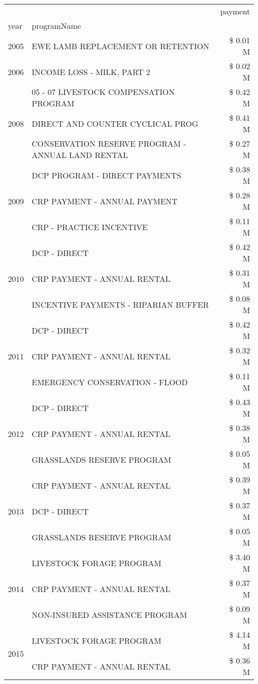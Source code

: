 \begin{tabular}{llr}
\toprule
 &  & payment \\
year & programName &  \\
\midrule
2005 & EWE LAMB REPLACEMENT OR RETENTION & \$ 0.01 M \\
\cline{1-3}
2006 & INCOME LOSS - MILK, PART 2 & \$ 0.02 M \\
\cline{1-3}
\multirow[t]{3}{*}{2008} & 05 - 07 LIVESTOCK COMPENSATION PROGRAM & \$ 0.42 M \\
 & DIRECT AND COUNTER CYCLICAL PROG & \$ 0.41 M \\
 & CONSERVATION RESERVE PROGRAM - ANNUAL LAND RENTAL & \$ 0.27 M \\
\cline{1-3}
\multirow[t]{3}{*}{2009} & DCP PROGRAM - DIRECT PAYMENTS & \$ 0.38 M \\
 & CRP PAYMENT - ANNUAL PAYMENT & \$ 0.28 M \\
 & CRP - PRACTICE INCENTIVE & \$ 0.11 M \\
\cline{1-3}
\multirow[t]{3}{*}{2010} & DCP - DIRECT & \$ 0.42 M \\
 & CRP PAYMENT - ANNUAL RENTAL & \$ 0.31 M \\
 & INCENTIVE PAYMENTS - RIPARIAN BUFFER & \$ 0.08 M \\
\cline{1-3}
\multirow[t]{3}{*}{2011} & DCP - DIRECT & \$ 0.42 M \\
 & CRP PAYMENT - ANNUAL RENTAL & \$ 0.32 M \\
 & EMERGENCY CONSERVATION - FLOOD & \$ 0.11 M \\
\cline{1-3}
\multirow[t]{3}{*}{2012} & DCP - DIRECT & \$ 0.43 M \\
 & CRP PAYMENT - ANNUAL RENTAL & \$ 0.38 M \\
 & GRASSLANDS RESERVE PROGRAM & \$ 0.05 M \\
\cline{1-3}
\multirow[t]{3}{*}{2013} & CRP PAYMENT - ANNUAL RENTAL & \$ 0.39 M \\
 & DCP - DIRECT & \$ 0.37 M \\
 & GRASSLANDS RESERVE PROGRAM & \$ 0.05 M \\
\cline{1-3}
\multirow[t]{3}{*}{2014} & LIVESTOCK FORAGE PROGRAM & \$ 3.40 M \\
 & CRP PAYMENT - ANNUAL RENTAL & \$ 0.37 M \\
 & NON-INSURED ASSISTANCE PROGRAM & \$ 0.09 M \\
\cline{1-3}
\multirow[t]{3}{*}{2015} & LIVESTOCK FORAGE PROGRAM & \$ 4.14 M \\
 & CRP PAYMENT - ANNUAL RENTAL & \$ 0.36 M \\

\end{tabular}
